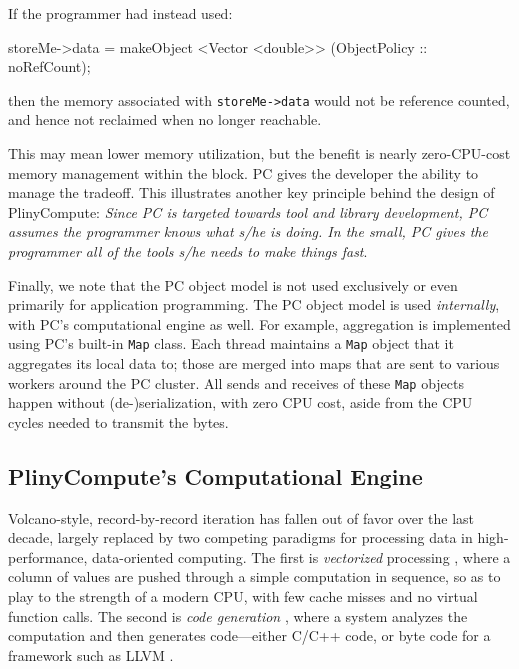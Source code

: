 If the 
programmer had instead used: 

\begin{code}
storeMe->data = makeObject <Vector <double>> (ObjectPolicy :: noRefCount);
\end{code}


\noindent then the memory associated with \texttt{storeMe->data} would
not be reference counted, and hence not reclaimed when no longer
reachable.  

This may mean lower memory utilization,
but the benefit is nearly zero-CPU-cost memory management within the block.
PC gives the developer the ability to manage the tradeoff.
This illustrates another key principle behind the design of
PlinyCompute: \emph{Since PC is targeted towards tool and library
  development, PC assumes the programmer knows what s/he is doing.  In
  the small, PC gives the programmer all of the tools s/he needs to make things fast}.

Finally, we note that the PC object model is not used exclusively or
even primarily for application programming.  The PC object model
is used \emph{internally}, with PC's computational engine as well.
For example, aggregation is implemented using PC's built-in
\texttt{Map} class.  Each thread maintains
a \texttt{Map} object that it aggregates its local data to; those are
merged into maps that are sent to various workers around the PC
cluster.  All sends and receives of these \texttt{Map} objects happen
without (de-)serialization, with zero CPU cost, aside from the CPU
cycles needed to transmit the bytes.



\subsection{PlinyCompute's Computational Engine}
\label{sec:engine}

Volcano-style, record-by-record iteration \cite{graefe1990encapsulation} has fallen out of favor over the last decade, largely replaced by
two competing paradigms for processing data
in high-performance, data-oriented computing.  The first is \emph{vectorized} processing \cite{abadi2009column, boncz2005monetdb, zukowski2005monetdb, idreos2012monetdb}, where a column of values are pushed
through a simple computation in sequence, so as to play to the strength of a modern CPU, with few cache misses and no virtual
function calls.  The second is \emph{code generation} \cite{neumann2011efficiently, nagel2014code, bress2017generating, klonatos2014building, ahmad2009dbtoaster}, where a system analyzes the computation
and then generates code---either C/C++ code, or byte code for a framework such as LLVM \cite{lattner2004llvm, lattner2002llvm}.

